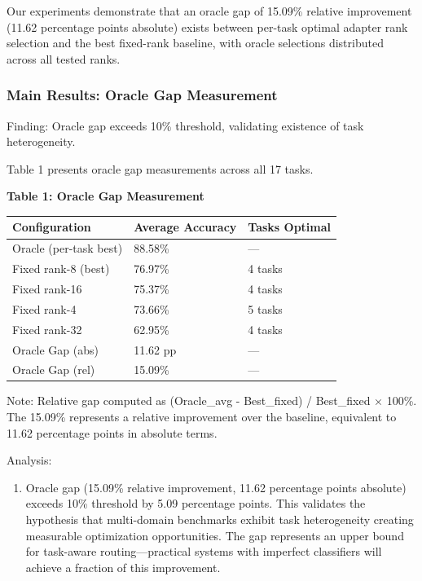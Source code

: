 
Our experiments demonstrate that an oracle gap of 15.09\% relative improvement (11.62 percentage points absolute) exists between per-task optimal adapter rank selection and the best fixed-rank baseline, with oracle selections distributed across all tested ranks.

\subsubsection{Main Results: Oracle Gap Measurement}

Finding: Oracle gap exceeds 10\% threshold, validating existence of task heterogeneity.

Table 1 presents oracle gap measurements across all 17 tasks.

\textbf{Table 1: Oracle Gap Measurement}

\begin{table}[htbp]
\centering
\begin{tabular}{lll}
\toprule
Configuration & Average Accuracy & Tasks Optimal \\
\midrule
Oracle (per-task best) & 88.58\% & — \\
Fixed rank-8 (best) & 76.97\% & 4 tasks \\
Fixed rank-16 & 75.37\% & 4 tasks \\
Fixed rank-4 & 73.66\% & 5 tasks \\
Fixed rank-32 & 62.95\% & 4 tasks \\
Oracle Gap (abs) & 11.62 pp & — \\
Oracle Gap (rel) & 15.09\% & — \\
\bottomrule
\end{tabular}
\end{table}

Note: Relative gap computed as (Oracle_avg - Best_fixed) / Best_fixed × 100\%. The 15.09\% represents a relative improvement over the baseline, equivalent to 11.62 percentage points in absolute terms.

Analysis:

\begin{enumerate}
\item Oracle gap (15.09\% relative improvement, 11.62 percentage points absolute) exceeds 10\% threshold by 5.09 percentage points. This validates the hypothesis that multi-domain benchmarks exhibit task heterogeneity creating measurable optimization opportunities. The gap represents an upper bound for task-aware routing—practical systems with imperfect classifiers will achieve a fraction of this improvement.
\end{enumerate}

